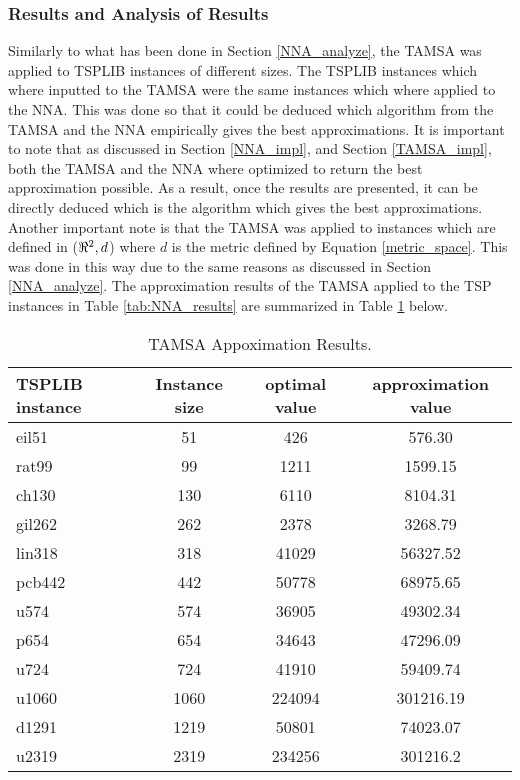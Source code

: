 \documentclass{article}
\begin{document}
\subsubsection{Results and Analysis of Results}
Similarly to what has been done in Section \ref{NNA_analyze}, the TAMSA was applied to TSPLIB instances of different sizes. The TSPLIB instances which where inputted to the TAMSA were the same instances which where applied to the NNA. This was done so that it could be deduced which algorithm from the TAMSA and the NNA empirically gives the best approximations. It is important to note that as discussed in Section \ref{NNA_impl}, and Section \ref{TAMSA_impl}, both the TAMSA and the NNA where optimized to return the best approximation possible. As a result, once the results are presented, it can be directly deduced which is the algorithm which gives the best approximations. Another important note is that the TAMSA was applied to instances which are defined in ($\real^2,d$) where $d$ is the metric defined by Equation \ref{metric_space}. This was done in this way due to the same reasons as discussed in Section \ref{NNA_analyze}. The approximation results of the TAMSA applied to the TSP instances in Table \ref{tab:NNA_results} are summarized in Table \ref{tab:TAMSA_results} below. 
\begin{table}[H]
    \caption{TAMSA Appoximation Results.}
    \label{tab:TAMSA_results}
    \begin{tabular}{l|c|c|c} %
      \textbf{TSPLIB instance} & \textbf{Instance size} & \textbf{optimal value} & \textbf{approximation value}\\
      \hline
    eil51 & 51 & 426 & 576.30\\
    rat99 & 99 & 1211 & 1599.15\\
    ch130 & 130 & 6110 & 8104.31\\
    gil262 & 262 & 2378 & 3268.79\\
    lin318 & 318 & 41029 & 56327.52\\
    pcb442 & 442 & 50778 & 68975.65\\
    u574 & 574  & 36905 & 49302.34\\ 
    p654 & 654 & 34643 & 47296.09\\
    u724 & 724 & 41910 & 59409.74\\
    u1060 & 1060 & 224094 & 301216.19\\
    d1291 & 1219 & 50801 & 74023.07\\
    u2319 & 2319 & 234256 & 301216.2
    \end{tabular}
\end{table}
\end{document}
